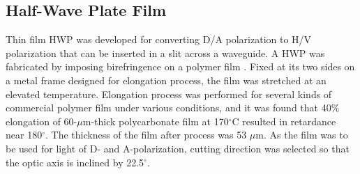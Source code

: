 \documentclass[letterpaper, 10pt]{article}
\begin{document}


\subsection{Half-Wave Plate Film}
Thin film HWP was developed for converting D/A polarization to H/V polarization that can be inserted in a slit across a waveguide.
A HWP was fabricated by imposing birefringence on a polymer film \cite{Ando:1993up}.
Fixed at its two sides on a metal frame designed for elongation process, the film was stretched at an elevated temperature.
Elongation process was performed for several kinds of commercial polymer film under various conditions, and it was found that 40\% elongation of 60-$\mu$m-thick polycarbonate film at 170$^\circ$C resulted in retardance near 180$^\circ$.
The thickness of the film after process was 53 $\mu$m.
As the film was to be used for light of D- and A-polarization, cutting direction was selected so that the optic axis is inclined by 22.5$^\circ$.
\end{document}
